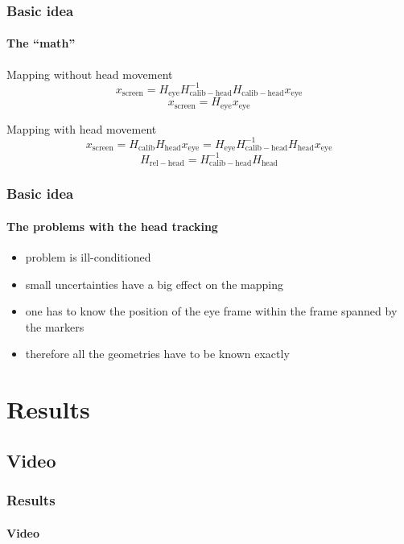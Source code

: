 \documentclass[%
14pt
]{beamer}
\begin{document}
\begin{frame}
	\frametitle{Basic idea}
  \framesubtitle{The ``math''}
  \begin{block}{Mapping without head movement}
    \begin{equation*}
      x_\mathrm{screen} = H_\mathrm{eye} H_\mathrm{calib-head} ^{-1} H_\mathrm{calib-head} x_\mathrm{eye}
    \end{equation*}
    \begin{equation*}
      x_\mathrm{screen} = H_\mathrm{eye}  x_\mathrm{eye}
    \end{equation*}
  \end{block}\pause
  \begin{block}{Mapping with head movement}
    \vspace*{-0.5cm}
    \begin{equation*}
      x_\mathrm{screen} = H_\mathrm{calib}H_\mathrm{head}x_\mathrm{eye} = H_\mathrm{eye} H_\mathrm{calib-head} ^{-1} H_\mathrm{head} x_\mathrm{eye}
    \end{equation*}
    \begin{equation*}
      H_\mathrm{rel-head} = H_\mathrm{calib-head}^{-1} H_\mathrm{head}
    \end{equation*}
  \end{block}
\end{frame}

\begin{frame}
	\frametitle{Basic idea}
  \framesubtitle{The problems with the head tracking}
  \begin{itemize}
    \item problem is ill-conditioned
    \item small uncertainties have a big effect on the mapping
    \item one has to know the position of the eye frame within the frame spanned by the markers
    \item therefore all the geometries have to be known exactly
  \end{itemize}
\end{frame}

\section{Results}
\subsection{Video}
\begin{frame}
	\frametitle{Results}
  \framesubtitle{Video}
\end{frame}
\end{document}
